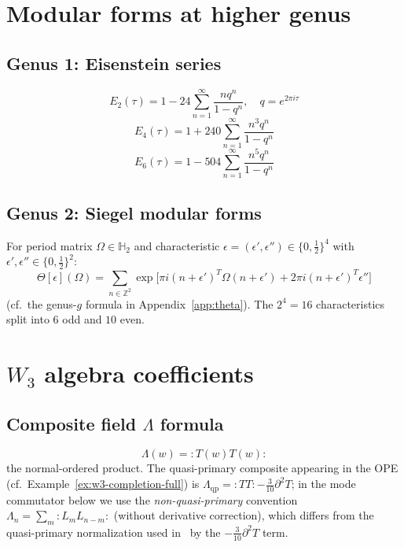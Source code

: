 \section{Modular forms at higher genus}

\subsection{Genus 1: Eisenstein series}

\[E_2(\tau) = 1 - 24\sum_{n=1}^\infty \frac{nq^n}{1-q^n}, \quad q = e^{2\pi i \tau}\]
\[E_4(\tau) = 1 + 240\sum_{n=1}^\infty \frac{n^3q^n}{1-q^n}\]
\[E_6(\tau) = 1 - 504\sum_{n=1}^\infty \frac{n^5q^n}{1-q^n}\]

\subsection{Genus 2: Siegel modular forms}

For period matrix $\Omega \in \mathbb{H}_2$ and characteristic $\epsilon = (\epsilon', \epsilon'') \in \{0, \tfrac{1}{2}\}^4$ with $\epsilon', \epsilon'' \in \{0, \tfrac{1}{2}\}^2$:
\[\Theta[\epsilon](\Omega) = \sum_{n \in \mathbb{Z}^2} \exp\bigl[\pi i(n+\epsilon')^T \Omega (n+\epsilon') + 2\pi i(n+\epsilon')^T \epsilon''\bigr]\]
(cf.\ the genus-$g$ formula in Appendix~\ref{app:theta}).  The $2^4 = 16$ characteristics split into $6$ odd and $10$ even.

\section{\texorpdfstring{$W_3$ algebra coefficients}{W-3 algebra coefficients}}
\label{app:w3-coefficients}
\label{app:w3-jacobi-full}

\subsection{\texorpdfstring{Composite field $\Lambda$ formula}{Composite field formula}}

\begin{equation}
\Lambda(w) = {:}T(w)T(w){:}
\end{equation}
the normal-ordered product.  The quasi-primary composite appearing in the OPE (cf.\ Example~\ref{ex:w3-completion-full}) is $\Lambda_{\mathrm{qp}} = {:}TT{:} - \tfrac{3}{10}\partial^2 T$; in the mode commutator below we use the \emph{non-quasi-primary} convention $\Lambda_n = \sum_m {:}L_m L_{n-m}{:}$ (without derivative correction), which differs from the quasi-primary normalization used in~\cite{Bouwknegt-Schoutens} by the $-\tfrac{3}{10}\partial^2 T$ term.

